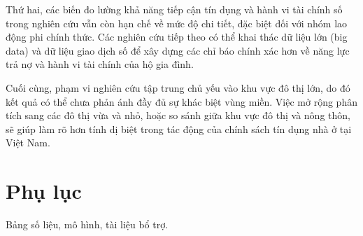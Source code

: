 \documentclass[12pt,a4paper]{report}
\begin{document}
	Thứ hai, các biến đo lường khả năng tiếp cận tín dụng và hành vi tài chính số trong nghiên cứu vẫn còn hạn chế về mức độ chi tiết, đặc biệt đối với nhóm lao động phi chính thức. Các nghiên cứu tiếp theo có thể khai thác dữ liệu lớn (big data) và dữ liệu giao dịch số để xây dựng các chỉ báo chính xác hơn về năng lực trả nợ và hành vi tài chính của hộ gia đình.
	
	Cuối cùng, phạm vi nghiên cứu tập trung chủ yếu vào khu vực đô thị lớn, do đó kết quả có thể chưa phản ánh đầy đủ sự khác biệt vùng miền. Việc mở rộng phân tích sang các đô thị vừa và nhỏ, hoặc so sánh giữa khu vực đô thị và nông thôn, sẽ giúp làm rõ hơn tính dị biệt trong tác động của chính sách tín dụng nhà ở tại Việt Nam.
	
	\newpage
	\printbibliography
	
	\newpage
	\appendix
	\section{Phụ lục}
	Bảng số liệu, mô hình, tài liệu bổ trợ.
	
\end{document}
